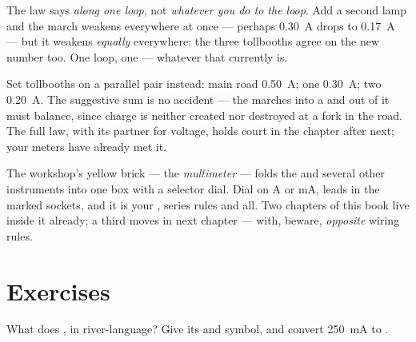 \begin{example}\label{ex:g8:intensity-ammeter:fineprint}
The law says \emph{along one loop}, not \emph{whatever you do to
the loop}. Add a second lamp  and the march weakens
everywhere at once --- perhaps \qty{0.30}{A} drops to
\qty{0.17}{A} --- but it weakens \emph{equally} everywhere: the
three tollbooths agree on the new number too. One loop, one
 --- whatever that  currently is.
\end{example}

\begin{example}\label{ex:g8:intensity-ammeter:junction}
Set tollbooths on a parallel pair instead: main road
\qty{0.50}{A};  one \qty{0.30}{A};  two
\qty{0.20}{A}. The suggestive sum is no accident --- the marches
into a  and out of it must balance, since charge is
neither created nor destroyed at a fork in the road. The full
law, with its partner for voltage, holds court in the
chapter after next; your meters have already met it.
\end{example}

\begin{remark}\label{rem:g8:intensity-ammeter:multimeter}
The workshop's yellow brick --- the \emph{multimeter} --- folds
the  and several other instruments into one box with a
selector dial. Dial on \unit{A} or \unit{mA}, leads in the
marked sockets, and it is your , series rules and all.
Two chapters of this book live inside it already; a third moves
in next chapter --- with, beware, \emph{opposite} wiring rules.
\end{remark}

\section{Exercises}

\begin{exercise}[$\star$]\label{exo:g8:intensity-ammeter:1}
What does  , in river-language? Give its 
and symbol, and convert \qty{250}{mA} to .
\end{exercise}

